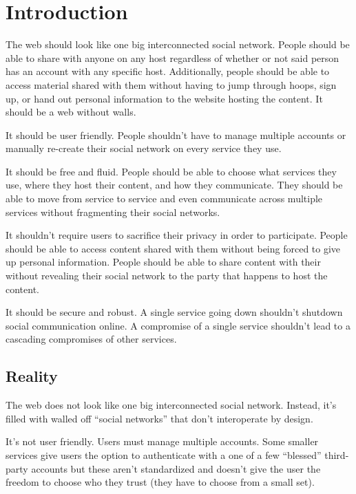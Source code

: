 \documentclass[pdftex,12pt,a4papaer,twoside,notitlepage]{report}
\begin{document}
\restoregeometry

\cleardoublepage

\tableofcontents

\cleardoublepage

\chapter{Introduction} 

The web should look like one big interconnected social network. People should be
able to share with anyone on any host regardless of whether or not said person
has an account with any specific host. Additionally, people should be able to
access material shared with them without having to jump through hoops, sign up,
or hand out personal information to the website hosting the content. It should
be a web without walls.

It should be user friendly. People shouldn't have to manage multiple accounts or
manually re-create their social network on every service they use.

It should be free and fluid. People should be able to choose what services they
use, where they host their content, and how they communicate. They should be
able to move from service to service and even communicate across multiple
services without fragmenting their social networks.

It shouldn't require users to sacrifice their privacy in order to participate.
People should be able to access content shared with them without being forced to
give up personal information. People should be able to share content with their
without revealing their social network to the party that happens to host the
content.

It should be secure and robust. A single service going down shouldn't shutdown
social communication online. A compromise of a single service shouldn't lead to
a cascading compromises of other services.

\section{Reality}

The web does not look like one big interconnected social network. Instead, it's
filled with walled off ``social networks'' that don't interoperate by design.

It's not user friendly. Users must manage multiple accounts. Some smaller
services give users the option to authenticate with a one of a few ``blessed''
third-party accounts but these aren't standardized and doesn't give the user the
freedom to choose who they trust (they have to choose from a small set).
\end{document}
